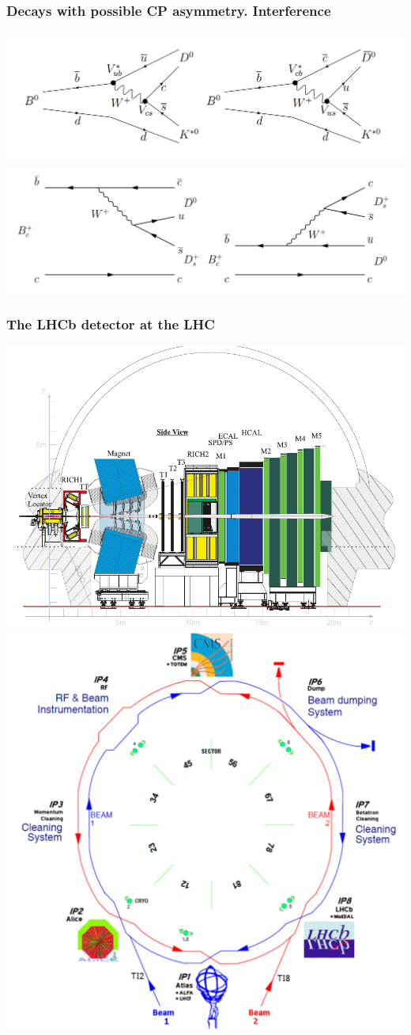 \documentclass[10pt, aspectratio=169]{beamer}
\begin{document}
\begin{frame}[label=diagrams]%
  \frametitle{Decays with possible CP asymmetry. Interference}
  \vfill
  \centering
  \includegraphics[width=.7\linewidth]{figures/lect/B2DKstar-diagram}
  \includegraphics[width=.7\linewidth]{figures/lect/Bc2DD-diagram}
\end{frame}%

\begin{frame}[label=lhcb]%
  \frametitle{The LHCb detector at the LHC}
  \includegraphics[width=.59\linewidth]{figures/conf/lhcb-detector}
  \includegraphics[width=.39\linewidth]{figures/conf/lhc-ring}
\end{frame}%
\end{document}
